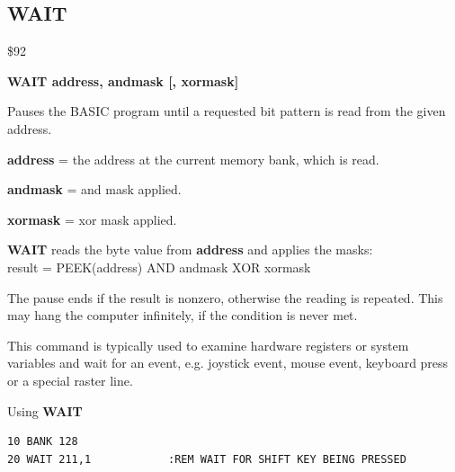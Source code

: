 
\newpage
\subsection{WAIT}
\begin{description}[leftmargin=2cm,style=nextline]
\item [Token:] \$92
\item [Format:] {\bf WAIT address, andmask [, xormask]}
\item [Usage:] Pauses the BASIC program until a requested
               bit pattern is read from the given address.

               {\bf address} = the address at the current memory
               bank, which is read.

               {\bf andmask} = and mask applied.

               {\bf xormask} = xor mask applied.

               {\bf WAIT} reads the byte value from {\bf address}
               and applies the masks: \\
               result = PEEK(address) AND andmask XOR xormask

               The pause ends if the result is nonzero, otherwise
               the reading is repeated. This may hang the computer
               infinitely, if the condition is never met.

\item [Remarks:] This command is typically used to examine hardware
               registers or system variables
               and wait for an event, e.g. joystick event,
               mouse event, keyboard press or a special raster line.

\item [Example:] Using {\bf WAIT}
\begin{tcolorbox}[colback=black,coltext=white]
\verbatimfont{\codefont}
\begin{verbatim}
10 BANK 128
20 WAIT 211,1            :REM WAIT FOR SHIFT KEY BEING PRESSED
\end{verbatim}
\end{tcolorbox}
\end{description}


\newpage
